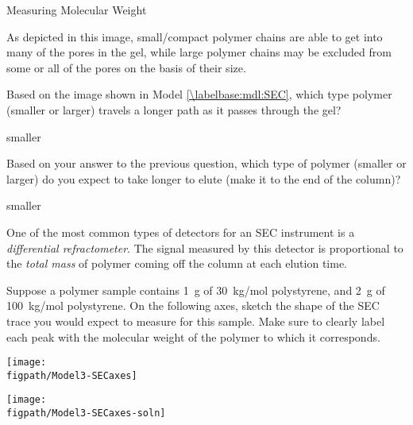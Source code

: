 \begin{activity}{Measuring Molecular Weight}
\begin{model}
	As depicted in this image, small/compact polymer chains are able to get into many of the pores in the gel, while large polymer chains may be excluded from some or all of the pores on the basis of their size.

\end{model}

\begin{ctqs}

	\question Based on the image shown in Model \ref{\labelbase:mdl:SEC}, which type polymer (smaller or larger) travels a longer path as it passes through the gel?
	
		\begin{solution}[0.5in]{}
			smaller
		\end{solution}
	
	\question Based on your answer to the previous question, which type of polymer (smaller or larger) do you expect to take longer to elute (make it to the end of the column)?
	
		\begin{solution}[0.5in]{}
			smaller
		\end{solution}
	
\end{ctqs}

\begin{infobox}
	One of the most common types of detectors for an SEC instrument is a \emph{differential refractometer}.  The signal measured by this detector is proportional to the \emph{total mass} of polymer coming off the column at each elution time.
\end{infobox}

\clearpage
\begin{ctqs}
	
	\question Suppose a polymer sample contains 1~g of 30~kg/mol polystyrene, and 2~g of 100~kg/mol polystyrene.  On the following axes, sketch the shape of the SEC trace you would expect to measure for this sample.  Make sure to clearly label each peak with the molecular weight of the polymer to which it corresponds.
	
		\begin{solution}[2in]{%
			\vspace{12pt}
			\centerline{\texttt{[image: \\figpath/Model3-SECaxes]}}
			}
			\vspace{12pt}
			\centerline{\texttt{[image: \\figpath/Model3-SECaxes-soln]}}
		\end{solution}
	

\end{ctqs}
\end{activity}
